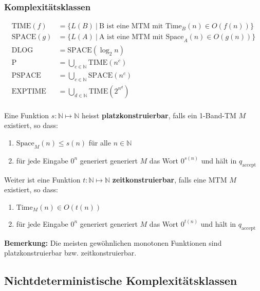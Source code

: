 \documentclass[11pt]{article}
\newcommand{\ttc}{\text{Time}}
\newcommand{\tsc}{\text{Space}}
\begin{document}
\subsubsection{Komplexitätsklassen}

\begin{equation*}
\begin{split}
	\text{TIME}(f) & = \{L(B)\ |\ \text{B ist eine MTM mit } \ttc_B(n) \in O(f(n))\} \\
	\text{SPACE}(g) & = \{L(A)\ |\ \text{A ist eine MTM mit } \tsc_A(n) \in O(g(n))\} \\
	\text{DLOG} & = \text{SPACE}(\log_2 n) \\
	\text{P} & = \bigcup_{c \in \mathbb{N}} \text{TIME}(n^c) \\
	\text{PSPACE} & = \bigcup_{c \in \mathbb{N}} \text{SPACE}(n^c) \\
	\text{EXPTIME} & = \bigcup_{d \in \mathbb{N}} \text{TIME}(2^{n^d}) \\
\end{split}
\end{equation*}

Eine Funktion $s: \mathbb{N} \mapsto \mathbb{N}$ heisst \textbf{platzkonstruierbar}, falls ein 1-Band-TM $M$ existiert, so dass:
\begin{enumerate}[label=(\roman*), noitemsep]
	\item $\tsc_M(n) \leq s(n)$ für alle $n \in \mathbb{N}$
	\item für jede Eingabe $0^n$ generiert generiert $M$ das Wort $0^{s(n)}$ und hält in $q_\text{accept}$
\end{enumerate}

Weiter ist eine Funktion $t: \mathbb{N} \mapsto \mathbb{N}$ \textbf{zeitkonstruierbar}, falls eine MTM $M$ existiert, so dass:
\begin{enumerate}[label=(\roman*), noitemsep]
	\item $\ttc_M(n) \in O(t(n))$
	\item für jede Eingabe $0^n$ generiert generiert $M$ das Wort $0^{t(n)}$ und hält in $q_\text{accept}$
\end{enumerate}

\textbf{Bemerkung:} Die meisten gewöhnlichen monotonen Funktionen sind platzkonstruierbar bzw. zeitkonstruierbar. \\

\subsection{Nichtdeterministische Komplexitätsklassen}
\end{document}
